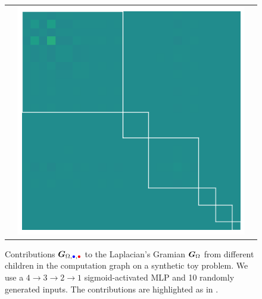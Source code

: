 \begin{figure}[t]
\begin{tabular}{ccc}
    &
      \includegraphics[width=0.22\linewidth]{../kfac_pinns_exp/exp04_gramian_contributions/fig/gram_hess_input_hess_input.png}
  \end{tabular}
  \caption{Contributions ${\bm{G}}_{\Omega,\textcolor{blue}{\bullet}, \textcolor{red}{\bullet}}$ to the Laplacian's Gramian ${\bm{G}}_{\Omega}$ from different children in the computation graph on a synthetic toy problem.
    We use a $4 \to 3 \to 2 \to 1$ sigmoid-activated MLP and 10 randomly generated inputs. The contributions are highlighted as in .}\label{fig:gramian-contribution-children}
\end{figure}
